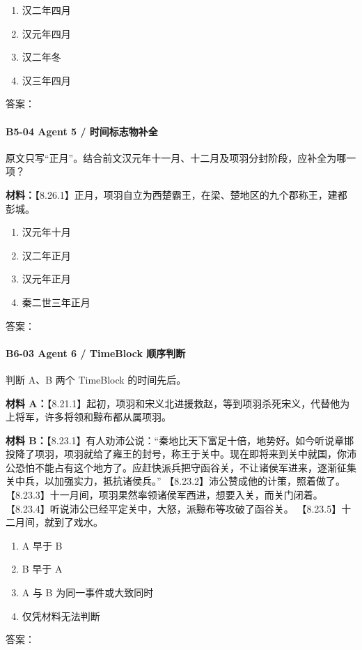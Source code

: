 \documentclass[fontset=none,11pt,a4paper]{ctexart}
\newcommand{\answerline}[1]{\underline{\hspace{#1}}}
\begin{document}
\begin{enumerate}[label=\Alph*.]
  \item 汉二年四月
  \item 汉元年四月
  \item 汉二年冬
  \item 汉三年四月
\end{enumerate}
答案：\answerline{2.2cm}

\paragraph{B5-04 \quad Agent 5 / 时间标志物补全}
原文只写“正月”。结合前文汉元年十一月、十二月及项羽分封阶段，应补全为哪一项？


\textbf{材料：}【8.26.1】正月，项羽自立为西楚霸王，在梁、楚地区的九个郡称王，建都彭城。


\begin{enumerate}[label=\Alph*.]
  \item 汉元年十月
  \item 汉二年正月
  \item 汉元年正月
  \item 秦二世三年正月
\end{enumerate}
答案：\answerline{2.2cm}

\paragraph{B6-03 \quad Agent 6 / TimeBlock 顺序判断}
判断 A、B 两个 TimeBlock 的时间先后。


\textbf{材料 A：}【8.21.1】起初，项羽和宋义北进援救赵，等到项羽杀死宋义，代替他为上将军，许多将领和黥布都从属项羽。

\textbf{材料 B：}【8.23.1】有人劝沛公说：“秦地比天下富足十倍，地势好。如今听说章邯投降了项羽，项羽就给了雍王的封号，称王于关中。现在即将来到关中就国，你沛公恐怕不能占有这个地方了。应赶快派兵把守函谷关，不让诸侯军进来，逐渐征集关中兵，以加强实力，抵抗诸侯兵。” 【8.23.2】沛公赞成他的计策，照着做了。 【8.23.3】十一月间，项羽果然率领诸侯军西进，想要入关，而关门闭着。 【8.23.4】听说沛公已经平定关中，大怒，派黥布等攻破了函谷关。 【8.23.5】十二月间，就到了戏水。


\begin{enumerate}[label=\Alph*.]
  \item A 早于 B
  \item B 早于 A
  \item A 与 B 为同一事件或大致同时
  \item 仅凭材料无法判断
\end{enumerate}
答案：\answerline{2.2cm}
\end{document}
